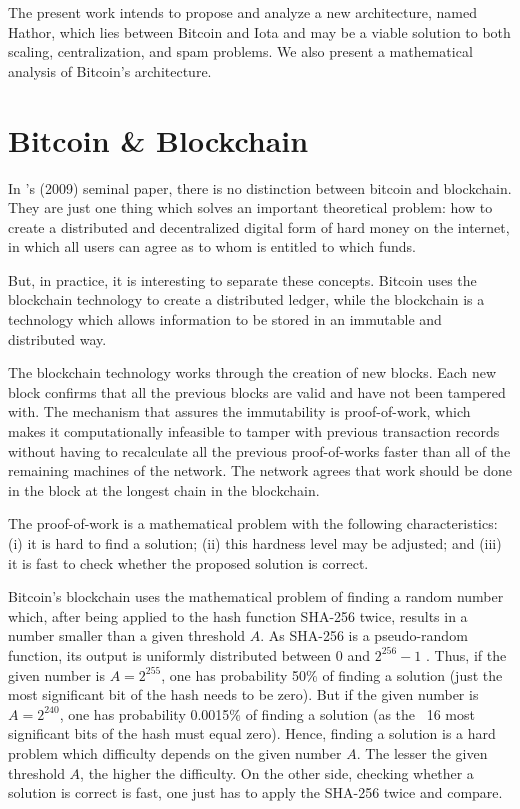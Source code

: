 The present work intends to propose and analyze a new architecture, named Hathor, which lies between Bitcoin and Iota and may be a viable solution to both scaling, centralization, and spam problems. We also present a mathematical analysis of Bitcoin's architecture.


\chapter{Bitcoin \& Blockchain}

In \citeauthor{nakamoto2008bitcoin}'s (2009) seminal paper, there is no distinction between bitcoin and blockchain. They are just one thing which solves an important theoretical problem: how to create a distributed and decentralized digital form of hard money on the internet, in which all users can agree as to whom is entitled to which funds.

But, in practice, it is interesting to separate these concepts. Bitcoin uses the blockchain technology to create a distributed ledger, while the blockchain is a technology which allows information to be stored in an immutable and distributed way.

The blockchain technology works through the creation of new blocks. Each new block confirms that all the previous blocks are valid and have not been tampered with. The mechanism that assures the immutability is proof-of-work, which makes it computationally infeasible to tamper with previous transaction records without having to recalculate all the previous proof-of-works faster than all of the remaining machines of the network. The network agrees that work should be done in the block at the longest chain in the blockchain.

The proof-of-work is a mathematical problem with the following characteristics: (i) it is hard to find a solution; (ii) this hardness level may be adjusted; and (iii) it is fast to check whether the proposed solution is correct.

Bitcoin's blockchain uses the mathematical problem of finding a random number which, after being applied to the hash function SHA-256 twice, results in a number smaller than a given threshold $A$. As SHA-256 is a pseudo-random function, its output is uniformly distributed between 0 and $2^{256}-1$ \citep{gilbert2003security}. Thus, if the given number is $A = 2^{255}$, one has probability 50\% of finding a solution (just the most significant bit of the hash needs to be zero). But if the given number is $A = 2^{240}$, one has probability 0.0015\% of finding a solution (as the ~16 most significant bits of the hash must equal zero). Hence, finding a solution is a hard problem which difficulty depends on the given number $A$. The lesser the given threshold $A$, the higher the difficulty. On the other side, checking whether a solution is correct is fast, one just has to apply the SHA-256 twice and compare.

